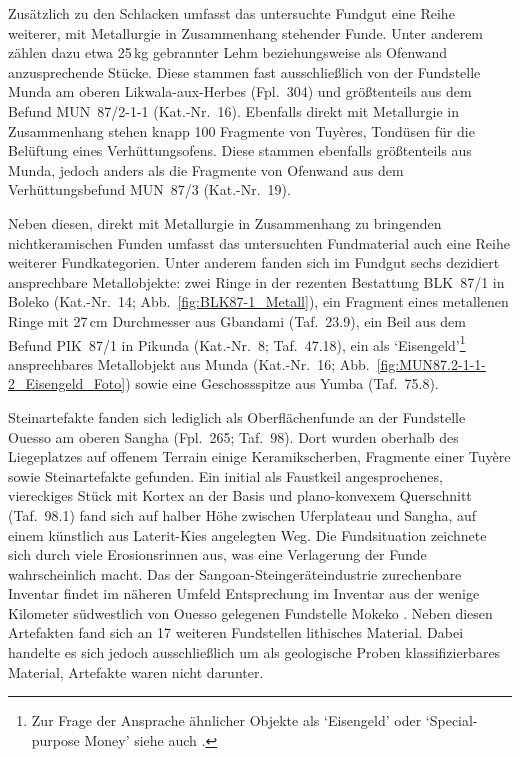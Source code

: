 Zusätzlich zu den Schlacken umfasst das untersuchte Fundgut eine Reihe weiterer, mit Metallurgie in Zusammenhang stehender Funde. Unter anderem zählen dazu etwa 25\,kg gebrannter Lehm beziehungsweise als Ofenwand anzusprechende Stücke. Diese stammen fast ausschließlich von der Fundstelle Munda am oberen Likwala-aux-Herbes (Fpl.~304) und größtenteils aus dem Befund MUN~87/2-1-1 (Kat.-Nr.~16). Ebenfalls direkt mit Metallurgie in Zusammenhang stehen knapp 100 Fragmente von Tuyères, Tondüsen für die Belüftung eines Verhüttungsofens. Diese stammen ebenfalls größtenteils aus Munda, jedoch anders als die Fragmente von Ofenwand aus dem Verhüttungsbefund MUN~87/3 (Kat.-Nr.~19).

Neben diesen, direkt mit Metallurgie in Zusammenhang zu bringenden nichtkeramischen Funden umfasst das untersuchten Fundmaterial auch eine Reihe weiterer Fundkategorien. Unter anderem fanden sich im Fundgut sechs dezidiert ansprechbare Metallobjekte: zwei Ringe in der rezenten Bestattung BLK~87/1 in Boleko (Kat.-Nr.~14; Abb.~\ref{fig:BLK87-1_Metall}), ein Fragment eines metallenen Ringe mit 27\,cm Durchmesser aus Gbandami (Taf.~23.9), ein Beil aus dem Befund PIK~87/1 in Pikunda (Kat.-Nr.~8; Taf.~47.18), ein als \enquote*{Eisengeld}\footnote{Zur Frage der Ansprache ähnlicher Objekte als \enquote*{Eisengeld} oder \enquote*{Special-purpose Money} siehe auch \textcite[119 Abb.~6.17, 122, 138]{Eggert.2016}.} ansprechbares Metallobjekt aus Munda (Kat.-Nr.~16; Abb.~\ref{fig:MUN87.2-1-1-2_Eisengeld_Foto}) sowie eine Geschossspitze aus Yumba (Taf.~75.8).

Steinartefakte fanden sich lediglich als Oberflächenfunde an der Fundstelle Ouesso am oberen Sangha (Fpl.~265; Taf.~98). Dort wurden oberhalb des Liegeplatzes auf offenem Terrain einige Keramikscherben, Fragmente einer Tuyère sowie Steinartefakte gefunden. Ein initial als Faustkeil angesprochenes, viereckiges Stück mit Kortex an der Basis und plano-konvexem Querschnitt (Taf.~98.1) fand sich auf halber Höhe zwischen Uferplateau und Sangha, auf einem künstlich aus Laterit-Kies angelegten Weg. Die Fundsituation zeichnete sich durch viele Erosionsrinnen aus, was eine Verlagerung der Funde wahrscheinlich macht. Das der Sangoan-Steingeräteindustrie zurechenbare Inventar findet im näheren Umfeld Entsprechung im Inventar aus der wenige Kilometer südwestlich von Ouesso gelegenen Fundstelle Mokeko \parencites{Lanfranchi.1991c}{Lanfranchi.1996b}. Neben diesen Artefakten fand sich an 17 weiteren Fundstellen lithisches Material. Dabei handelte es sich jedoch ausschließlich um als geologische Proben klassifizierbares Material, Artefakte waren nicht darunter.


